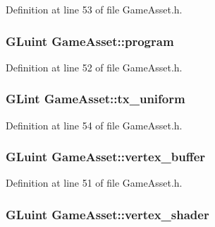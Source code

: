 Definition at line 53 of file Game\-Asset.\-h.

\hypertarget{classGameAsset_a239f03ead1a34924e76d6f875216404b}{
\subsubsection[{program}]{\setlength{\rightskip}{0pt plus 5cm}G\-Luint Game\-Asset\-::program\hspace{0.3cm}{\ttfamily [protected]}}}\label{classGameAsset_a239f03ead1a34924e76d6f875216404b}


Definition at line 52 of file Game\-Asset.\-h.

\hypertarget{classGameAsset_a21126e946d621a0e03d61738404b34d2}{
\subsubsection[{tx\-\_\-uniform}]{\setlength{\rightskip}{0pt plus 5cm}G\-Lint Game\-Asset\-::tx\-\_\-uniform\hspace{0.3cm}{\ttfamily [protected]}}}\label{classGameAsset_a21126e946d621a0e03d61738404b34d2}


Definition at line 54 of file Game\-Asset.\-h.

\hypertarget{classGameAsset_a1a1d227eba2765b025f9f453700c2359}{
\subsubsection[{vertex\-\_\-buffer}]{\setlength{\rightskip}{0pt plus 5cm}G\-Luint Game\-Asset\-::vertex\-\_\-buffer\hspace{0.3cm}{\ttfamily [protected]}}}\label{classGameAsset_a1a1d227eba2765b025f9f453700c2359}


Definition at line 51 of file Game\-Asset.\-h.

\hypertarget{classGameAsset_aba95de2870f78ac21568bbf9dd7e2b40}{
\subsubsection[{vertex\-\_\-shader}]{\setlength{\rightskip}{0pt plus 5cm}G\-Luint Game\-Asset\-::vertex\-\_\-shader\hspace{0.3cm}{\ttfamily [protected]}}}\label{classGameAsset_aba95de2870f78ac21568bbf9dd7e2b40}


